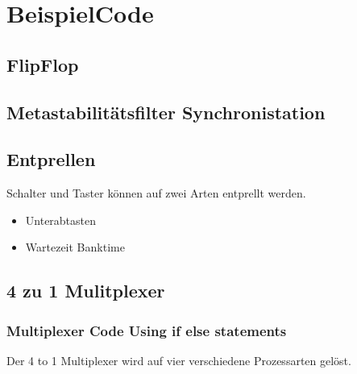 \section{BeispielCode}
\subsection{FlipFlop}

\subsection{Metastabilitätsfilter Synchronistation}


%
\subsection{Entprellen}
Schalter und Taster können auf zwei Arten entprellt werden.\\
\begin{itemize}
\item Unterabtasten
\item Wartezeit Banktime
\end{itemize}

\subsection{4 zu 1 Mulitplexer}
\subsubsection{Multiplexer Code Using if else statements}
Der 4 to 1 Multiplexer wird auf vier verschiedene Prozessarten gelöst.

%
%
%